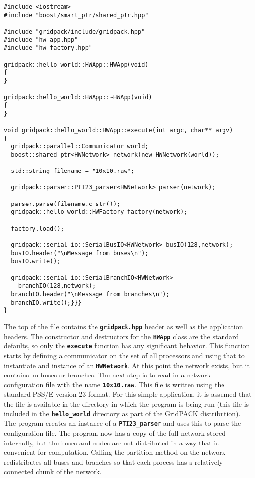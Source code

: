 {
\color{red}
\begin{Verbatim}[fontseries=b]
#include <iostream>
#include "boost/smart_ptr/shared_ptr.hpp"

#include "gridpack/include/gridpack.hpp"
#include "hw_app.hpp"
#include "hw_factory.hpp"

gridpack::hello_world::HWApp::HWApp(void)
{
}

gridpack::hello_world::HWApp::~HWApp(void)
{
}

void gridpack::hello_world::HWApp::execute(int argc, char** argv)
{
  gridpack::parallel::Communicator world;
  boost::shared_ptr<HWNetwork> network(new HWNetwork(world));

  std::string filename = "10x10.raw";

  gridpack::parser::PTI23_parser<HWNetwork> parser(network);

  parser.parse(filename.c_str());
  gridpack::hello_world::HWFactory factory(network);

  factory.load();

  gridpack::serial_io::SerialBusIO<HWNetwork> busIO(128,network);
  busIO.header("\nMessage from buses\n");
  busIO.write();

  gridpack::serial_io::SerialBranchIO<HWNetwork>
    branchIO(128,network);
  branchIO.header("\nMessage from branches\n");
  branchIO.write();}}}
}
\end{Verbatim}
}

The top of the file contains the \texttt{\textbf{gridpack.hpp}} header as well as the application headers. The constructor and destructors for the \texttt{\textbf{HWApp}} class are the standard defaults, so only the \texttt{\textbf{execute}} function has any significant behavior. This function starts by defining a communicator on the set of all processors and using that to instantiate and instance of an \texttt{\textbf{HWNetwork}}. At this point the network exists, but it contains no buses or branches. The next step is to read in a network configuration file with the name \texttt{\textbf{10x10.raw}}. This file is written using the standard PSS/E version 23 format. For this simple application, it is assumed that the file is available in the directory in which the program is being run (this file is included in the \texttt{\textbf{hello\_world}} directory as part of the GridPACK distribution). The program creates an instance of a \texttt{\textbf{PTI23\_parser}} and uses this to parse the configuration file. The program now has a copy of the full network stored internally, but the buses and nodes are not distributed in a way that is convenient for computation. Calling the partition method on the network redistributes all buses and branches so that each process has a relatively connected chunk of the network.

